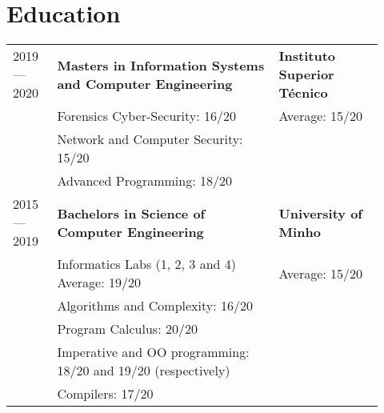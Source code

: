 \documentclass{article}
\begin{document}
\begin{tabular}{p{0.11\linewidth}p{0.73\linewidth}l}
\end{tabular}

\section{Education}

\begin{tabular}{p{0.11\linewidth}p{0.55\linewidth}p{0.26\linewidth}}

    2019 --- 2020 &
        \textbf{Masters in Information Systems and Computer Engineering}
    &
        \textbf{Instituto Superior Técnico}
    \\
    & Forensics Cyber-Security: 16/20 & Average: 15/20 \\
    & Network and Computer Security: 15/20 &\\
    & Advanced Programming: 18/20 &\\

    2015 --- 2019
    &
        \textbf{Bachelors in Science of Computer Engineering}
    &
        \textbf{University of Minho}
    \\
    & Informatics Labs (1, 2, 3 and 4) Average: 19/20 & Average: 15/20 \\
    & Algorithms and Complexity: 16/20 & \\
    & Program Calculus: 20/20 & \\
    & Imperative and OO programming: 18/20 and 19/20 (respectively) &\\
    & Compilers: 17/20 &\\

\end{tabular}


\end{document}
